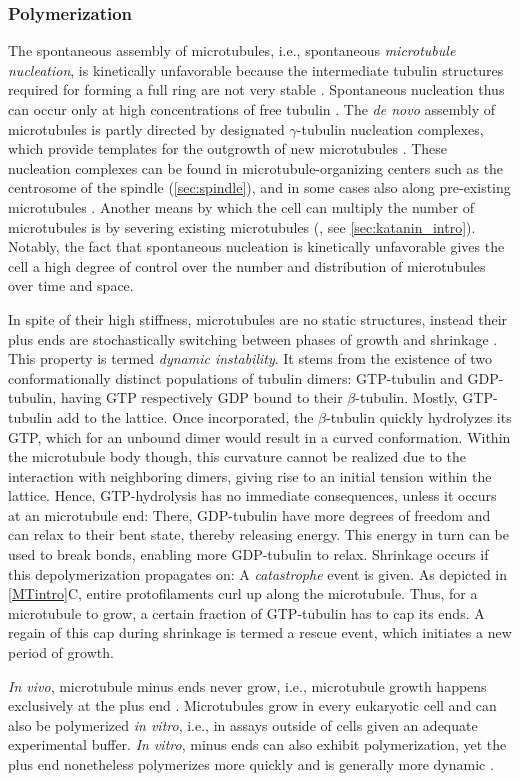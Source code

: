 \subsubsection{Polymerization}
\label{sec:instability}
The spontaneous assembly of microtubules, i.e., spontaneous \textit{microtubule nucleation}, is kinetically unfavorable because the intermediate tubulin structures required for forming a full ring are not very stable \parencite{Akhmanova2022}. Spontaneous nucleation thus can occur only at high concentrations of free tubulin \parencite{Fygenson1994}. The \textit{de novo} assembly of microtubules is partly directed by designated $\gamma$-tubulin nucleation complexes, which provide templates for the outgrowth of new microtubules \parencite{Akhmanova2022}. These nucleation complexes can be found in microtubule-organizing centers such as the centrosome of the spindle (\autoref{sec:spindle}), and in some cases also along pre-existing microtubules \parencite{Akhmanova2022, Janson2007}. Another means by which the cell can multiply the number of microtubules is by severing existing microtubules (\cite{Vemu2018}, see \autoref{sec:katanin_intro}). Notably, the fact that spontaneous nucleation is kinetically unfavorable gives the cell a high degree of control over the number and distribution of microtubules over time and space. \par
In spite of their high stiffness, microtubules are no static structures, instead their plus ends are stochastically switching between phases of growth and shrinkage \parencite{Janosi2002}. This property is termed \textit{dynamic instability}. It stems from the existence of two conformationally distinct populations of tubulin dimers: GTP-tubulin and GDP-tubulin, having GTP respectively GDP bound to their $\beta$-tubulin. Mostly, GTP-tubulin add to the lattice. Once incorporated, the $\beta$-tubulin quickly hydrolyzes its GTP, which for an unbound dimer would result in a curved conformation. Within the microtubule body though, this curvature cannot be realized due to the interaction with neighboring dimers, giving rise to an initial tension within the lattice. Hence, GTP-hydrolysis has no immediate consequences, unless it occurs at an microtubule end: There, GDP-tubulin have more degrees of freedom and can relax to their bent state, thereby releasing energy. This energy in turn can be used to break bonds, enabling more GDP-tubulin to relax. Shrinkage occurs if this depolymerization propagates on: A \textit{catastrophe} event is given. As depicted in \autoref{MTintro}C, entire protofilaments curl up along the microtubule. Thus, for a microtubule to grow, a certain fraction of GTP-tubulin has to cap its ends. A regain of this cap during shrinkage is termed a rescue event, which initiates a new period of growth.\par
\textit{In vivo}, microtubule minus ends never grow, i.e., microtubule growth happens exclusively at the plus end \parencite{dammer}. Microtubules grow in every eukaryotic cell and can also be polymerized \textit{in vitro}, i.e., in assays outside of cells given an adequate experimental buffer. \textit{In vitro}, minus ends can also exhibit polymerization, yet the plus end nonetheless polymerizes more quickly and is generally more dynamic \parencite{Howard2003}. 

